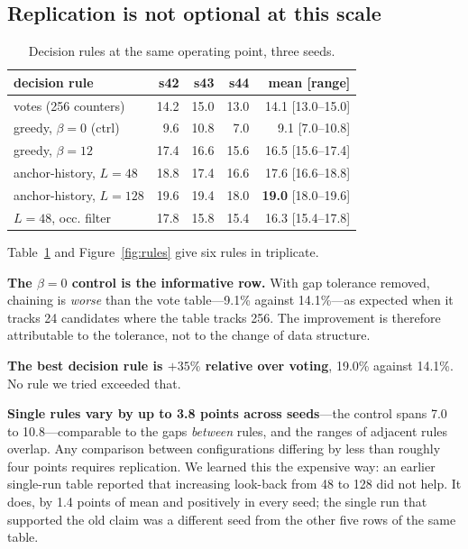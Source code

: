 \documentclass[sigconf,nonacm]{acmart}
\begin{document}
\subsection{Replication is not optional at this scale}

\begin{table}[t]
\caption{Decision rules at the same operating point, three seeds.}
\label{tab:rules}
\small
\begin{tabular}{lrrrr}
\toprule
decision rule & s42 & s43 & s44 & mean [range] \\
\midrule
votes (256 counters)        & 14.2 & 15.0 & 13.0 & 14.1 [13.0--15.0] \\
greedy, $\beta = 0$ (ctrl)  & 9.6 & 10.8 & 7.0 & 9.1 [7.0--10.8] \\
greedy, $\beta = 12$        & 17.4 & 16.6 & 15.6 & 16.5 [15.6--17.4] \\
anchor-history, $L = 48$    & 18.8 & 17.4 & 16.6 & 17.6 [16.6--18.8] \\
anchor-history, $L = 128$   & 19.6 & 19.4 & 18.0 & \textbf{19.0} [18.0--19.6] \\
\quad $L = 48$, occ. filter & 17.8 & 15.8 & 15.4 & 16.3 [15.4--17.8] \\
\bottomrule
\end{tabular}
\end{table}

Table~\ref{tab:rules} and Figure~\ref{fig:rules} give six rules in triplicate.

\textbf{The $\beta = 0$ control is the informative row.} With gap tolerance removed, chaining is
\emph{worse} than the vote table---9.1\% against 14.1\%---as expected when it tracks 24
candidates where the table tracks 256. The improvement is therefore attributable to the
tolerance, not to the change of data structure.

\textbf{The best decision rule is $+35\%$ relative over voting}, 19.0\% against 14.1\%. No rule
we tried exceeded that.

\textbf{Single rules vary by up to 3.8 points across seeds}---the control spans 7.0 to
10.8---comparable to the gaps \emph{between} rules, and the ranges of adjacent rules overlap. Any
comparison between configurations differing by less than roughly four points requires
replication. We learned this the expensive way: an earlier single-run table reported that
increasing look-back from 48 to 128 did not help. It does, by 1.4 points of mean and positively
in every seed; the single run that supported the old claim was a different seed from the other
five rows of the same table.
\end{document}
